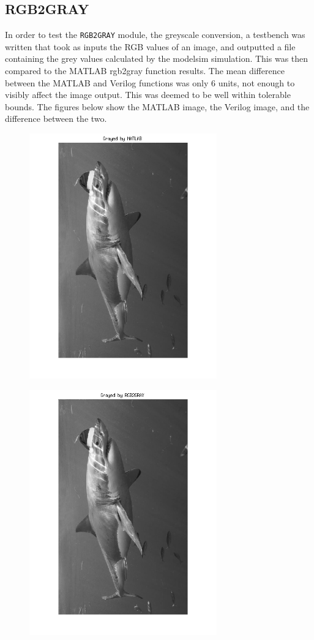 \documentclass[12pt]{article}
\begin{document}
  \subsection{RGB2GRAY}
    In order to test the \texttt{RGB2GRAY} module, the greyscale conversion, a testbench was written that took as inputs the RGB values of an image, and outputted a file containing the grey values calculated by the modelsim simulation. This was then compared to the MATLAB rgb2gray function results. The mean difference between the MATLAB and Verilog functions was only 6 units, not enough to visibly affect the image output. This was deemed to be well within tolerable bounds. The figures below show the MATLAB image, the Verilog image, and the difference between the two. 
\begin{figure}[H]
  \centering
  \includegraphics[height=300pt, angle=-90]{Images/RGB2GRAY/MATLAB.png}
\end{figure}

\begin{figure}[H]
  \centering
  \includegraphics[height=300pt, angle=-90]{Images/RGB2GRAY/Verilog.png}
\end{figure}
\end{document}
